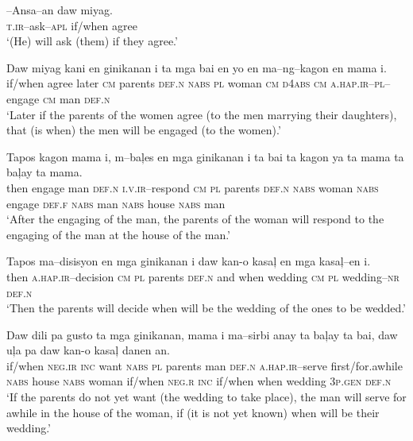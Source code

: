 \ea
\gll \emptyset--Ansa--an  daw  miyag. \\
\textsc{t.ir}--ask--\textsc{apl}  if/when  agree \\
\glt  `(He) will ask (them) if they agree.’
\z

\ea
\gll  Daw  miyag  kani  en  ginikanan  i  ta  mga  bai  en   yo  en  ma--ng--kagon  en  mama  i. \\
if/when  agree  later  \textsc{cm}  parents  \textsc{def.n}  \textsc{nabs}  \textsc{pl}  woman  \textsc{cm}
\textsc{d}4\textsc{abs}  \textsc{cm}  \textsc{a.hap.ir}--\textsc{pl}--engage  \textsc{cm}  man  \textsc{def.n} \\
\glt `Later if the parents of the women agree (to the men marrying their daughters), that (is when) the men will be engaged (to the women).'
\z

\ea
\gll  Tapos  kagon  mama  i,  m--ba\c{l}es  en  mga ginikanan  i  ta  bai   ta  kagon  ya  ta  mama  ta  ba\c{l}ay  ta  mama. \\
then  engage  man  \textsc{def.n}  \textsc{i.v.ir}--respond  \textsc{cm}  \textsc{pl}  parents  \textsc{def.n}  \textsc{nabs}  woman
\textsc{nabs}  engage  \textsc{def.f}  \textsc{nabs}  man  \textsc{nabs}  house  \textsc{nabs}  man \\
\glt  `After the engaging of the man, the parents of the woman will respond to the engaging of the man at the house of the man.’
\z

\ea
\gll  Tapos  ma--disisyon  en  mga  ginikanan  i  daw  kan-o   kasa\c{l}  en  mga  kasa\c{l}--en  i. \\
then  \textsc{a.hap.ir}--decision  \textsc{cm}  \textsc{pl}  parents  \textsc{def.n}  and  when
wedding  \textsc{cm}  \textsc{pl}  wedding--\textsc{nr}  \textsc{def.n} \\
\glt  `Then the parents will decide when will be the wedding of the ones to be wedded.’
\z

\ea
\gll  Daw  dili  pa  gusto  ta  mga  ginikanan,  mama  i  ma--sirbi  anay  ta  ba\c{l}ay  ta  bai,   daw  u\c{l}a  pa  daw  kan-o  kasa\c{l}  danen  an. \\
if/when  \textsc{neg.ir}  \textsc{inc}  want  \textsc{nabs}  \textsc{pl}  parents
man  \textsc{def.n}  \textsc{a.hap.ir}--serve  first/for.awhile  \textsc{nabs}  house  \textsc{nabs}  woman
if/when  \textsc{neg.r}  \textsc{inc}  if/when  when  wedding  3\textsc{p.gen}  \textsc{def.n} \\
\glt  `If the parents do not yet want (the wedding to take place), the man will serve for awhile in the house of the woman, if (it is not yet known) when will be their wedding.’
\z

